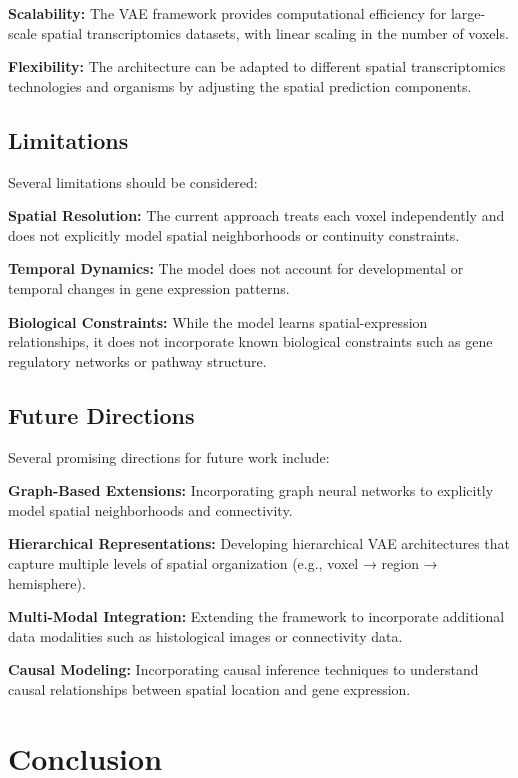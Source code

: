 \documentclass[11pt]{article}
\begin{document}
\textbf{Scalability:} The VAE framework provides computational efficiency for large-scale spatial transcriptomics datasets, with linear scaling in the number of voxels.

\textbf{Flexibility:} The architecture can be adapted to different spatial transcriptomics technologies and organisms by adjusting the spatial prediction components.

\subsection{Limitations}

Several limitations should be considered:

\textbf{Spatial Resolution:} The current approach treats each voxel independently and does not explicitly model spatial neighborhoods or continuity constraints.

\textbf{Temporal Dynamics:} The model does not account for developmental or temporal changes in gene expression patterns.

\textbf{Biological Constraints:} While the model learns spatial-expression relationships, it does not incorporate known biological constraints such as gene regulatory networks or pathway structure.

\subsection{Future Directions}

Several promising directions for future work include:

\textbf{Graph-Based Extensions:} Incorporating graph neural networks to explicitly model spatial neighborhoods and connectivity.

\textbf{Hierarchical Representations:} Developing hierarchical VAE architectures that capture multiple levels of spatial organization (e.g., voxel → region → hemisphere).

\textbf{Multi-Modal Integration:} Extending the framework to incorporate additional data modalities such as histological images or connectivity data.

\textbf{Causal Modeling:} Incorporating causal inference techniques to understand causal relationships between spatial location and gene expression.

\section{Conclusion}
\label{sec:conclusion}
\end{document}
